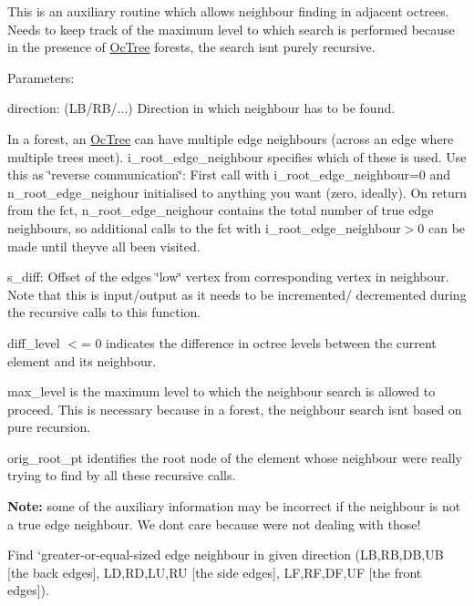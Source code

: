 This is an auxiliary routine which allows neighbour finding in adjacent octrees. Needs to keep track of the maximum level to which search is performed because in the presence of \hyperlink{classoomph_1_1OcTree}{Oc\+Tree} forests, the search isn\textquotesingle{}t purely recursive.

Parameters\+:
\begin{DoxyItemize}
\item direction\+: (L\+B/\+R\+B/...) Direction in which neighbour has to be found.
\item In a forest, an \hyperlink{classoomph_1_1OcTree}{Oc\+Tree} can have multiple edge neighbours (across an edge where multiple trees meet). {\ttfamily i\+\_\+root\+\_\+edge\+\_\+neighbour} specifies which of these is used. Use this as \char`\"{}reverse communication\char`\"{}\+: First call with {\ttfamily i\+\_\+root\+\_\+edge\+\_\+neighbour=0} and {\ttfamily n\+\_\+root\+\_\+edge\+\_\+neighour} initialised to anything you want (zero, ideally). On return from the fct, {\ttfamily n\+\_\+root\+\_\+edge\+\_\+neighour} contains the total number of true edge neighbours, so additional calls to the fct with {\ttfamily i\+\_\+root\+\_\+edge\+\_\+neighbour$>$0} can be made until they\textquotesingle{}ve all been visited.
\item s\+\_\+diff\+: Offset of the edge\textquotesingle{}s \char`\"{}low\char`\"{} vertex from corresponding vertex in neighbour. Note that this is input/output as it needs to be incremented/ decremented during the recursive calls to this function.
\item diff\+\_\+level $<$= 0 indicates the difference in octree levels between the current element and its neighbour.
\item max\+\_\+level is the maximum level to which the neighbour search is allowed to proceed. This is necessary because in a forest, the neighbour search isn\textquotesingle{}t based on pure recursion.
\item orig\+\_\+root\+\_\+pt identifies the root node of the element whose neighbour we\textquotesingle{}re really trying to find by all these recursive calls.
\end{DoxyItemize}{\bfseries Note\+:} some of the auxiliary information may be incorrect if the neighbour is not a true edge neighbour. We don\textquotesingle{}t care because we\textquotesingle{}re not dealing with those!

Find `greater-\/or-\/equal-\/sized edge neighbour\textquotesingle{} in given direction (LB,RB,DB,UB \mbox{[}the back edges\mbox{]}, LD,RD,LU,RU \mbox{[}the side edges\mbox{]}, LF,RF,DF,UF \mbox{[}the front edges\mbox{]}).

